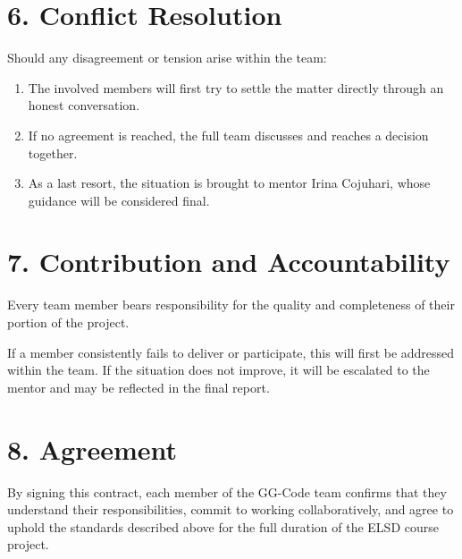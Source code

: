 \section*{6. Conflict Resolution}

Should any disagreement or tension arise within the team:

\begin{enumerate}[leftmargin=2em]
    \item The involved members will first try to settle the matter directly through an honest conversation.
    \item If no agreement is reached, the full team discusses and reaches a decision together.
    \item As a last resort, the situation is brought to mentor Irina Cojuhari, whose guidance will be considered final.
\end{enumerate}

\section*{7. Contribution and Accountability}

Every team member bears responsibility for the quality and completeness of their portion of
the project.

If a member consistently fails to deliver or participate, this will first be addressed within
the team. If the situation does not improve, it will be escalated to the mentor and may be
reflected in the final report.

\section*{8. Agreement}

By signing this contract, each member of the GG-Code team confirms that they understand their
responsibilities, commit to working collaboratively, and agree to uphold the standards described
above for the full duration of the ELSD course project.

\vspace{2em}

